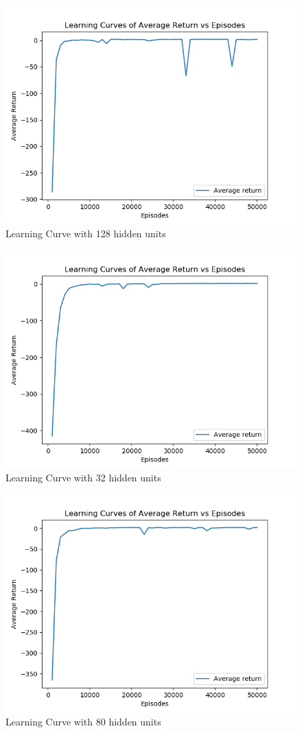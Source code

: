 \documentclass[10pt,letterpaper]{article}
\begin{document}
\begin{enumerate}
\begin{enumerate}
			\begin{figure}[H]
				\centering
				\includegraphics[width=0.7\linewidth]{Part5BLearningCurve_128.png}
				\caption{Learning Curve with 128 hidden units}
				\label{fig:part5b_128}
			\end{figure}

			\begin{figure}[H]
				\centering
				\includegraphics[width=0.7\linewidth]{Part5BLearningCurve_32.png}
				\caption{Learning Curve with 32 hidden units}
				\label{fig:part5b_32}
			\end{figure}

			\begin{figure}[H]
				\centering
				\includegraphics[width=0.7\linewidth]{Part5BLearningCurve_80.png}
				\caption{Learning Curve with 80 hidden units}
				\label{fig:part5b_80}
			\end{figure}


\end{enumerate}
\end{enumerate}
\end{document}
